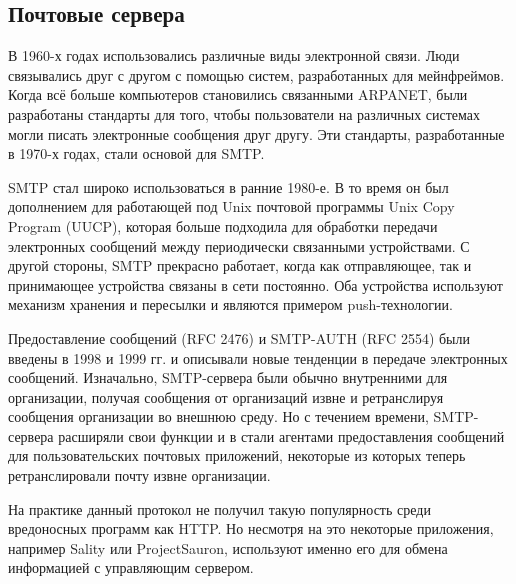 \subsection{Почтовые сервера}

В 1960-х годах использовались различные виды электронной связи. Люди связывались друг с другом с помощью систем, разработанных для мейнфреймов. Когда всё больше компьютеров становились связанными ARPANET, были разработаны стандарты для того, чтобы пользователи на различных системах могли писать электронные сообщения друг другу. Эти стандарты, разработанные в 1970-х годах, стали основой для SMTP.

SMTP стал широко использоваться в ранние 1980-е. В то время он был дополнением для работающей под Unix почтовой программы Unix Copy Program (UUCP), которая больше подходила для обработки передачи электронных сообщений между периодически связанными устройствами. С другой стороны, SMTP прекрасно работает, когда как отправляющее, так и принимающее устройства связаны в сети постоянно. Оба устройства используют механизм хранения и пересылки и являются примером push-технологии.

Предоставление сообщений (RFC 2476) и SMTP-AUTH (RFC 2554) были введены в 1998 и 1999 гг. и описывали новые тенденции в передаче электронных сообщений. Изначально, SMTP-сервера были обычно внутренними для организации, получая сообщения от организаций извне и ретранслируя сообщения организации во внешнюю среду. Но с течением времени, SMTP-сервера расширяли свои функции и в стали агентами предоставления сообщений для пользовательских почтовых приложений, некоторые из которых теперь ретранслировали почту извне организации.

На практике данный протокол не получил такую популярность среди вредоносных программ как HTTP. Но несмотря на это некоторые приложения, например Sality или ProjectSauron, используют именно его для обмена информацией с управляющим сервером.